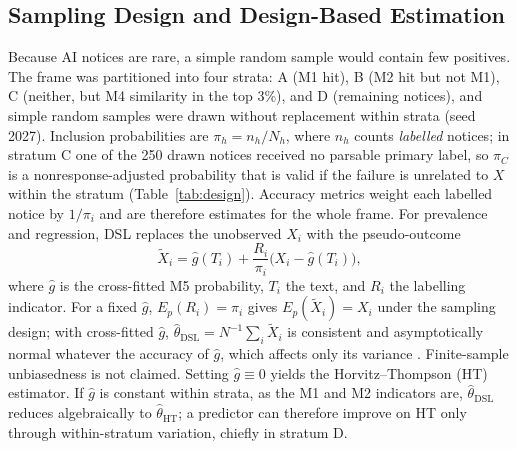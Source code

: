 \documentclass[runningheads]{llncs}
\begin{document}
\subsection{Sampling Design and Design-Based Estimation}
Because AI notices are rare, a simple random sample would contain few positives. The frame was partitioned into four strata: A (M1 hit), B (M2 hit but not M1), C (neither, but M4 similarity in the top 3\%), and D (remaining notices), and simple random samples were drawn without replacement within strata (seed 2027). Inclusion probabilities are $\pi_h=n_h/N_h$, where $n_h$ counts \emph{labelled} notices; in stratum C one of the 250 drawn notices received no parsable primary label, so $\pi_C$ is a nonresponse-adjusted probability that is valid if the failure is unrelated to $X$ within the stratum (Table~\ref{tab:design}). Accuracy metrics weight each labelled notice by $1/\pi_i$ and are therefore estimates for the whole frame. For prevalence and regression, DSL replaces the unobserved $X_i$ with the pseudo-outcome
\begin{equation}
\tilde{X}_i=\hat{g}(T_i)+\frac{R_i}{\pi_i}\bigl(X_i-\hat{g}(T_i)\bigr),
\label{eq:pseudo}
\end{equation}
where $\hat{g}$ is the cross-fitted M5 probability, $T_i$ the text, and $R_i$ the labelling indicator. For a fixed $\hat{g}$, $E_p(R_i)=\pi_i$ gives $E_p(\tilde{X}_i)=X_i$ under the sampling design; with cross-fitted $\hat{g}$, $\hat\theta_{\mathrm{DSL}}=N^{-1}\sum_i\tilde{X}_i$ is consistent and asymptotically normal whatever the accuracy of $\hat{g}$, which affects only its variance \cite{egami2023}. Finite-sample unbiasedness is not claimed. Setting $\hat{g}\equiv0$ yields the Horvitz--Thompson (HT) estimator. If $\hat{g}$ is constant within strata, as the M1 and M2 indicators are, $\hat\theta_{\mathrm{DSL}}$ reduces algebraically to $\hat\theta_{\mathrm{HT}}$; a predictor can therefore improve on HT only through within-stratum variation, chiefly in stratum D.
\end{document}
